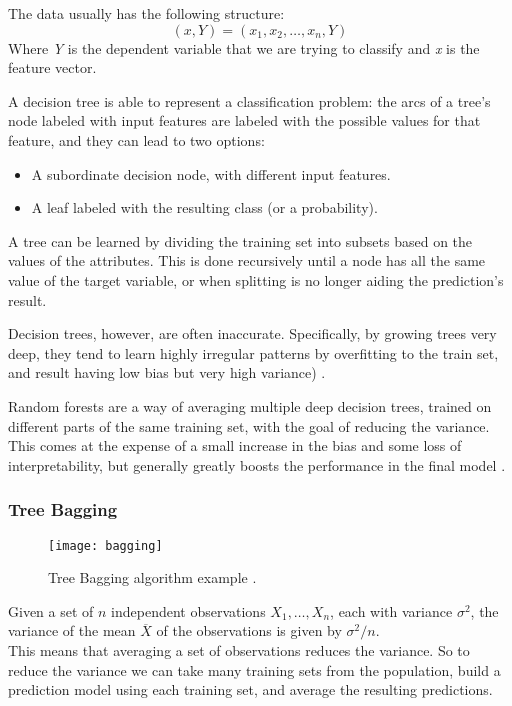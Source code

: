 The data usually has the following structure: 
\begin{equation}
	(x, Y) = (x_1, x_2, \dots, x_n, Y)
\end{equation}
Where \textit{Y} is the dependent variable that we are trying to classify and \textit{x} is the feature vector.

A decision tree is able to represent a classification problem:
the arcs of a tree's node labeled with input features are labeled with the possible values for that feature, and they can lead to two options:
\begin{itemize}[noitemsep]
	\item A subordinate decision node, with different input features.
	\item A leaf labeled with the resulting class (or a probability).
\end{itemize}

A tree can be learned by dividing the training set into subsets based on the values of the attributes. This is done recursively until a node has all the same value of the target variable, or when splitting is no longer aiding the prediction's result.


Decision trees, however, are often inaccurate. Specifically, by growing trees very deep, they tend to learn highly irregular patterns by overfitting to the train set, and result having low bias but very high variance) \cite{ESL}. 

Random forests are a way of averaging multiple deep decision trees, trained on different parts of the same training set, with the goal of reducing the variance. \\
This comes at the expense of a small increase in the bias and some loss of interpretability, but generally greatly boosts the performance in the final model \cite{ESL}. 

\subsubsection{Tree Bagging}

\begin{figure}[H]
	\centering
	\texttt{[image: bagging]}
	\caption{Tree Bagging algorithm example \cite{bagging}.}
	\label{fig:bagging}
\end{figure}

Given a set of $n$ independent observations $X_1, \dots, X_n$, each with variance $\sigma^2$, the variance of the mean $\overline{X}$ of the observations is given by $\sigma^2/n$. \\
This means that averaging a set of observations reduces the variance. So to reduce the variance we can take many training sets from the population, build a prediction model using each training set, and average the resulting predictions. 

